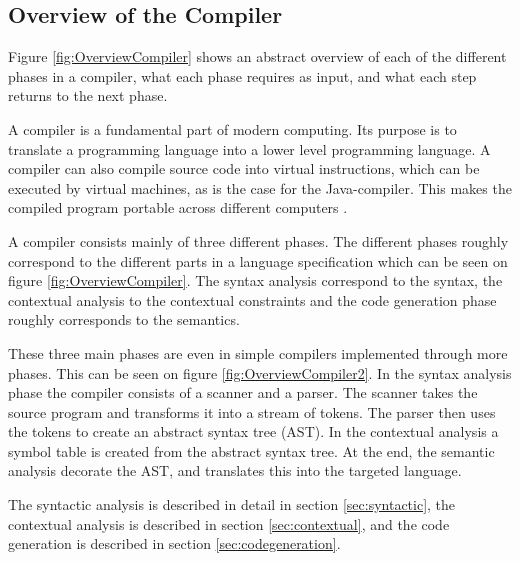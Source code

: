 \subsection{Overview of the Compiler}
\label{sec:OverviewCompiler}
Figure \ref{fig:OverviewCompiler} shows an abstract overview of each of the different phases in a compiler, what each phase requires as input, and what each step returns to the next phase.

A compiler is a fundamental part of modern computing. Its purpose is to translate a programming language into a lower level programming language. A compiler can also compile source code into virtual instructions, which can be executed by virtual machines, as is the case for the Java-compiler. This makes the compiled program portable across different computers \citep{CraftingACompiler}.

A compiler consists mainly of three different phases. The different phases roughly correspond to the different parts in a language specification which can be seen on figure \ref{fig:OverviewCompiler}. The syntax analysis correspond to the syntax, the contextual analysis to the contextual constraints and the code generation phase roughly corresponds to the semantics.

These three main phases are even in simple compilers implemented through more phases. This can be seen on figure \ref{fig:OverviewCompiler2}. In the syntax analysis phase the compiler consists of a scanner and a parser. The scanner takes the source program and transforms it into a stream of tokens. The parser then uses the tokens to create an abstract syntax tree (AST). In the contextual analysis a symbol table is created from the abstract syntax tree. At the end, the semantic analysis decorate the AST, and translates this into the targeted language.

The syntactic analysis is described in detail in section \ref{sec:syntactic}, the contextual analysis is described in section \ref{sec:contextual}, and the code generation is described in section \ref{sec:codegeneration}.

